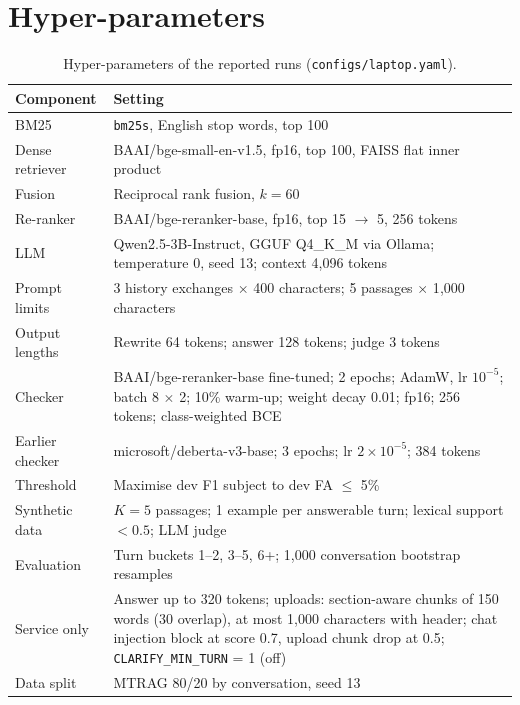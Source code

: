 \documentclass[11pt,a4paper]{report}
\begin{document}
\chapter{Hyper-parameters}
\begin{table}[H]
\centering\small
\begin{tabularx}{\textwidth}{@{}lY@{}}
\toprule
Component & Setting \\
\midrule
BM25 & \texttt{bm25s}, English stop words, top 100 \\
Dense retriever & BAAI/bge-small-en-v1.5, fp16, top 100, FAISS flat inner product \\
Fusion & Reciprocal rank fusion, $k = 60$ \\
Re-ranker & BAAI/bge-reranker-base, fp16, top 15 $\to$ 5, 256 tokens \\
LLM & Qwen2.5-3B-Instruct, GGUF Q4\_K\_M via Ollama; temperature 0, seed 13; context 4{,}096 tokens \\
Prompt limits & 3 history exchanges $\times$ 400 characters; 5 passages $\times$ 1{,}000 characters \\
Output lengths & Rewrite 64 tokens; answer 128 tokens; judge 3 tokens \\
Checker & BAAI/bge-reranker-base fine-tuned; 2 epochs; AdamW, lr $10^{-5}$; batch 8 $\times$ 2; 10\% warm-up; weight decay 0.01; fp16; 256 tokens; class-weighted BCE \\
Earlier checker & microsoft/deberta-v3-base; 3 epochs; lr $2\times10^{-5}$; 384 tokens \\
Threshold & Maximise dev F1 subject to dev FA $\le$ 5\% \\
Synthetic data & $K = 5$ passages; 1 example per answerable turn; lexical support $< 0.5$; LLM judge \\
Evaluation & Turn buckets 1--2, 3--5, 6+; 1{,}000 conversation bootstrap resamples \\
Service only & Answer up to 320 tokens; uploads: section-aware chunks of 150 words (30 overlap), at most 1{,}000 characters with header; chat injection block at score 0.7, upload chunk drop at 0.5; \texttt{CLARIFY\_MIN\_TURN} = 1 (off) \\
Data split & MTRAG 80/20 by conversation, seed 13 \\
\bottomrule
\end{tabularx}
\caption{Hyper-parameters of the reported runs (\texttt{configs/laptop.yaml}).}
\end{table}
\end{document}
